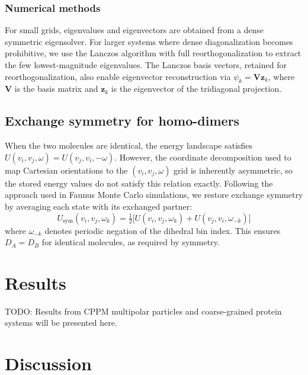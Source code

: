\documentclass[aps,jcp,reprint,superscriptaddress]{revtex4-2}
\begin{document}
\subsubsection{Numerical methods}

For small grids, eigenvalues and eigenvectors are obtained from a dense
symmetric eigensolver.
For larger systems where dense diagonalization becomes prohibitive, we use the
Lanczos algorithm with full reorthogonalization to extract the few
lowest-magnitude eigenvalues.
The Lanczos basis vectors, retained for reorthogonalization, also enable
eigenvector reconstruction via $\psi_k = \mathbf{V} \mathbf{z}_k$, where
$\mathbf{V}$ is the basis matrix and $\mathbf{z}_k$ is the eigenvector of the
tridiagonal projection.

\subsection{Exchange symmetry for homo-dimers}
\label{sec:exchange}

When the two molecules are identical, the energy landscape satisfies
$U(v_i, v_j, \omega) = U(v_j, v_i, -\omega)$.
However, the coordinate decomposition used to map Cartesian orientations
to the $(v_i, v_j, \omega)$ grid is inherently asymmetric, so the stored
energy values do not satisfy this relation exactly.
Following the approach used in Faunus Monte Carlo simulations, we restore
exchange symmetry by averaging each state with its exchanged partner:
\begin{equation}
  U_\mathrm{sym}(v_i, v_j, \omega_k)
  = \tfrac{1}{2}\bigl[U(v_i, v_j, \omega_k) + U(v_j, v_i, \omega_{-k})\bigr]
  \label{eq:exchange}
\end{equation}
where $\omega_{-k}$ denotes periodic negation of the dihedral bin index.
This ensures $D_A = D_B$ for identical molecules, as required by symmetry.

\section{Results}
\label{sec:results}

TODO: Results from CPPM multipolar particles and coarse-grained protein systems
will be presented here.

\section{Discussion}
\label{sec:discussion}
\end{document}
